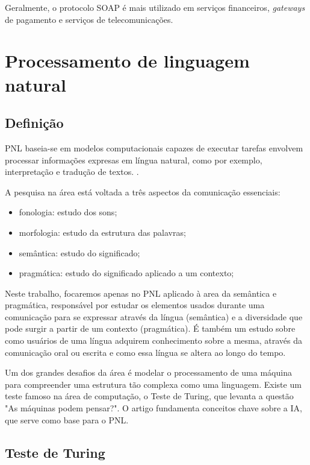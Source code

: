 Geralmente, o protocolo SOAP é mais utilizado em serviços financeiros, \textit{gateways} de pagamento e serviços de telecomunicações.

\section{Processamento de linguagem natural}\label{sec:pnl}

\subsection{Definição}

\ac{PNL} baseia-se em modelos computacionais capazes de executar tarefas envolvem processar informações expresas em língua natural, como por exemplo, interpretação e tradução de textos. \cite{covington1994natural}.

A pesquisa na área está voltada a três aspectos da comunicação essenciais:

\begin{itemize}
	\item fonologia: estudo dos sons;
	\item morfologia: estudo da estrutura das palavras;
	\item semântica: estudo do significado;
	\item pragmática: estudo do significado aplicado a um contexto;
\end{itemize}

Neste trabalho, focaremos apenas no PNL aplicado à area da semântica e pragmática, responsável por estudar os elementos usados durante uma comunicação para se expressar através da língua (semântica) e a diversidade que pode surgir a partir de um contexto (pragmática). É também um estudo sobre como usuários de uma língua adquirem conhecimento sobre a mesma, através da comunicação oral ou escrita e como essa língua se altera ao longo do tempo.

Um dos grandes desafios da área é modelar o processamento de uma máquina para compreender uma estrutura tão complexa como uma linguagem. Existe um teste famoso na área de computação, o Teste de Turing, que levanta a questão "As máquinas podem pensar?". O artigo fundamenta conceitos chave sobre a \ac{IA}, que serve como base para o PNL.

\subsection{Teste de Turing}

